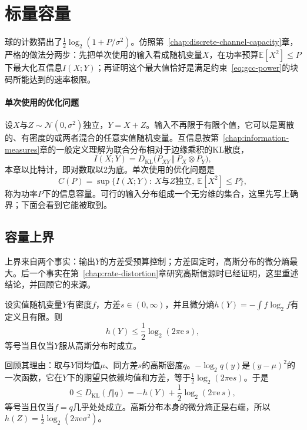 \section{标量容量}
\label{sec:gcc-scalar}

球的计数猜出了$\frac12\log_2(1+P/\sigma^2)$。仿照第~\ref{chap:discrete-channel-capacity}章，严格的做法分两步：先把单次使用的输入看成随机变量$X$，在功率预算$\mathbb{E}[X^2]\leq P$下最大化互信息$I(X;Y)$；再证明这个最大值恰好是满足约束~\eqref{eq:gcc-power}的块码所能达到的速率极限。

\paragraph{单次使用的优化问题}
设$X$与$Z\sim\mathcal{N}(0,\sigma^2)$独立，$Y=X+Z$。输入不再限于有限个值，它可以是离散的、有密度的或两者混合的任意实值随机变量。互信息按第~\ref{chap:information-measures}章的一般定义理解为联合分布相对于边缘乘积的KL散度，
\[
 I(X;Y)=D_{\mathrm{KL}}\bigl(P_{XY}\,\Vert\,P_X\otimes P_Y\bigr),
\]
本章以比特计，即对数取以2为底。单次使用的优化问题是
\begin{equation}
 C(P)=\sup\bigl\{I(X;Y):\ X\text{与}Z\text{独立},\ \mathbb{E}[X^2]\leq P\bigr\} ,
 \label{eq:gcc-info-capacity}
\end{equation}
称为功率$P$下的信息容量。可行的输入分布组成一个无穷维的集合，这里先写上确界；下面会看到它能被取到。

\subsection{容量上界}
\label{sec:gcc-upper}

上界来自两个事实：输出$Y$的方差受预算控制；方差固定时，高斯分布的微分熵最大。后一个事实在第~\ref{chap:rate-distortion}章研究高斯信源时已经证明，这里重述结论，并回顾它的来源。

\begin{lemma}[固定方差的熵上界]
\label{lem:gcc-max-entropy}
设实值随机变量$Y$有密度$f$，方差$s\in(0,\infty)$，并且微分熵$h(Y)=-\int f\log_2f$有定义且有限。则
\begin{equation}
 h(Y)\leq\frac12\log_2(2\pi\mathrm{e}\,s),
 \label{eq:gcc-max-entropy}
\end{equation}
等号当且仅当$Y$服从高斯分布时成立。
\end{lemma}

回顾其理由：取与$Y$同均值$\mu$、同方差$s$的高斯密度$q$。$-\log_2q(y)$是$(y-\mu)^2$的一次函数，它在$Y$下的期望只依赖均值和方差，等于$\frac12\log_2(2\pi\mathrm{e}s)$。于是
\[
 0\leq D_{\mathrm{KL}}(f\Vert q)=-h(Y)+\frac12\log_2(2\pi\mathrm{e}\,s),
\]
等号当且仅当$f=q$几乎处处成立。高斯分布本身的微分熵正是右端，所以$h(Z)=\frac12\log_2(2\pi\mathrm{e}\sigma^2)$。

